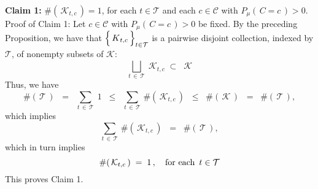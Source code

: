 \vskip 0.3cm
\noindent
\textbf{Claim 1:}\quad
$\#\!\left(\,\mathcal{K}_{t,c}\,\right) = 1$, for each $t \in \mathcal{T}$ and each $c \in \mathcal{C}$ with
$P_{\mu}\!\left(\,C=c\,\right) > 0$.
\vskip 0.2cm
\noindent
Proof of Claim 1:\quad
Let $c \in \mathcal{C}$ with $P_{\mu}\!\left(\,C=c\,\right) > 0$ be fixed.
By the preceding Proposition, we have that
$\left\{\,\overset{{\color{white}.}}{K}_{t,c}\,\right\}_{t\in\mathcal{T}}$
is a pairwise disjoint collection, indexed by $\mathcal{T}$, of nonempty subsets of $\mathcal{K}$:
\begin{equation*}
\underset{t\,\in\,\mathcal{T}}{\bigsqcup}\; \mathcal{K}_{t,c}
\; \subset \;\;
\mathcal{K}
\end{equation*}
Thus, we have
\begin{equation*}
\#\!\left(\,\mathcal{T}\,\right)
\;\; = \;\;
	\underset{t\,\in\,\mathcal{T}}{\sum}\; 1
\;\; \leq \;\;
	\underset{t\,\in\,\mathcal{T}}{\sum}\, \#\!\left(\,\mathcal{K}_{t,c}\,\right)
\;\; \leq \;\;
	\#\!\left(\,\mathcal{K}\,\right)
\;\; = \;\;
	\#\!\left(\,\mathcal{T}\,\right),
\end{equation*}
which implies
\begin{equation*}
\underset{t\,\in\,\mathcal{T}}{\sum}\, \#\!\left(\,\mathcal{K}_{t,c}\,\right)
\;\; = \;\;
	\#\!\left(\,\mathcal{T}\,\right),
\end{equation*}
which in turn implies
\begin{equation*}
\#\!\left(\,\mathcal{K}_{t,c}\,\right) \; = \; 1\,,
\quad
\textnormal{for each \,$t \in \mathcal{T}$}
\end{equation*}
This proves Claim 1.

